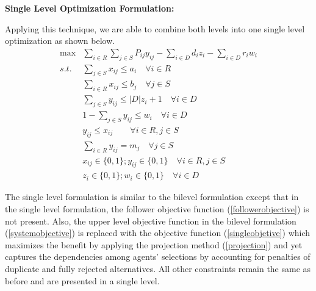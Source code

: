 \documentclass[11pt, letterpaper]{article}
\begin{document}
\begin{flushleft}
	\textbf{ Single Level Optimization Formulation: }
\end{flushleft}
Applying this technique, we are able to combine both levels into one single level optimization as shown below.
\begin{align}
\max			& \displaystyle\sum_{i \in	R} \displaystyle\sum_{j \in S}  P_{ij} y_{ij} - \displaystyle\sum_{i \in D} d_i	z_{i}	- \displaystyle\sum_{i \in D} r_i w_{i}		\label{singleobjetive} \\
s.t.       & \displaystyle\sum_{j \in S} x_{ij} \leq a_i  \quad\forall i \in R \label{upperdemandproj}\\
&\displaystyle\sum_{i \in R} x_{ij} \leq b_j   \quad\forall j \in S \label{uppersupplyproj}\\
& \displaystyle\sum_{j \in S} y_{ij} \leq |D| z_{i} + 1   \quad\forall i \in D \label{duplicateconstraintproj} \\ 
& 1-\displaystyle\sum_{j \in S} y_{ij} \leq w_{i}  \quad\forall i \in D \label{fullrejectionconstraintproj} \\ 
& 	 y_{ij} \leq x_{ij}  \quad\quad\forall i \in R, j \in S \label{hookingconstraintproj} \\
&  \displaystyle\sum_{i \in	R} y_{ij} = m_j  \quad\forall j \in S \label{upperlevelofselectionproj}\\ 
&  x_{ij} \in \{ 0,1 \}; y_{ij}  \in \{ 0,1 \}  \quad \forall i \in R, j\in S  \label{vars} \\
&  z_{i} \in \{ 0,1 \}; w_{i} \in \{ 0,1 \}  \quad \forall i \in D \label{variables_leaderproj} 
\end{align}

\noindent

The single level formulation is similar to the bilevel formulation except that in the single level formulation, the follower objective function (\ref{followerobjective}) is not present. Also, the upper level objective function in the bilevel formulation (\ref{systemobjective}) is replaced with the objective function (\ref{singleobjetive}) which maximizes the benefit by applying the projection method (\ref{projection}) and yet captures the dependencies among agents' selections by accounting for penalties of duplicate and fully rejected alternatives. All other constraints remain the same as before and are presented in a single level.
\end{document}
